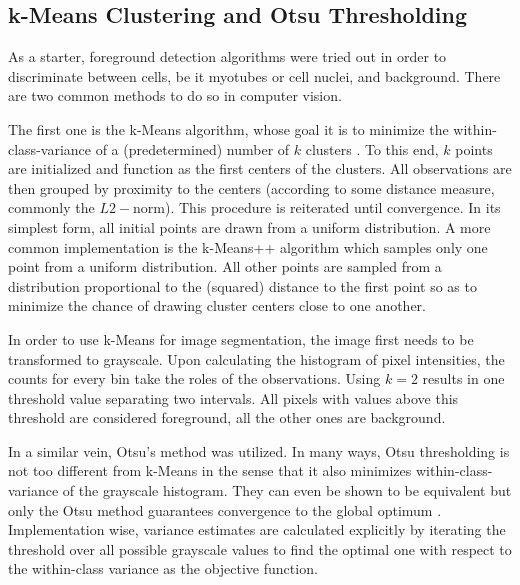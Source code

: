 \subsection{k-Means Clustering and Otsu Thresholding}
As a starter, foreground detection algorithms were tried out in order to discriminate between cells, be it myotubes or cell nuclei, and background. There are two common methods to do so in computer vision. 

The first one is the k-Means algorithm, whose goal it is to minimize the within-class-variance of a (predetermined) number of $k$ clusters \cite{bishop2006}. To this end, $k$ points are initialized and function as the first centers of the clusters. All observations are then grouped by proximity to the centers (according to some distance measure, commonly the $L2-$norm). This procedure is reiterated until convergence. In its simplest form, all initial points are drawn from a uniform distribution. A more common implementation is the k-Means++ algorithm \cite{kmeans} which samples only one point from a uniform distribution. All other points are sampled from a distribution proportional to the (squared) distance to the first point so as to minimize the chance of drawing cluster centers close to one another.

In order to use k-Means for image segmentation, the image first needs to be transformed to grayscale. Upon calculating the histogram of pixel intensities, the counts for every bin take the roles of the observations. Using $k = 2$ results in one threshold value separating two intervals. All pixels with values above this threshold are considered foreground, all the other ones are background.

In a similar vein, Otsu's method \cite{otsu} was utilized. In many ways, Otsu thresholding is not too different from k-Means in the sense that it also minimizes within-class-variance of the grayscale histogram. They can even be shown to be equivalent but only the Otsu method guarantees convergence to the global optimum \cite{liu2009otsu}. Implementation wise, variance estimates are calculated explicitly by iterating the threshold over all possible grayscale values to find the optimal one with respect to the within-class variance as the objective function.

